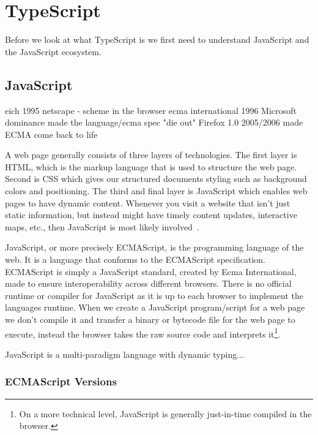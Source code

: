 
\section{TypeScript}\label{sec:typescript}

Before we look at what TypeScript is we first need to understand JavaScript and the JavaScript ecosystem.

\subsection{JavaScript}\label{subsec:javascript}


eich 1995 netscape - scheme in the browser
ecma international 1996
Microsoft dominance made the language/ecma spec "die out"
Firefox 1.0 2005/2006 made ECMA come back to life

A web page generally consists of three layers of technologies.
The first layer is HTML, which is the markup language that is used to structure the web page.
Second is CSS which gives our structured documents styling such as background colors and positioning.
The third and final layer is JavaScript which enables web pages to have dynamic content.
Whenever you visit a website that isn't just static information, but instead might have timely content updates, interactive maps, etc., then JavaScript is most likely involved~\cite{whatisjs}.

JavaScript, or more precisely ECMAScript, is the programming language of the web.
It is a language that conforms to the ECMAScript specification.
ECMAScript is simply a JavaScript standard, created by Ecma International, made to ensure interoperability across different browsers.
There is no official runtime or compiler for JavaScript as it is up to each browser to implement the languages runtime.
When we create a JavaScript program/script for a web page we don't compile it and transfer a binary or bytecode file for the web page to execute, instead the browser takes the raw source code and interprets it\footnote{On a more technical level, JavaScript is generally just-in-time compiled in the browser.}.

JavaScript is a multi-paradigm language with dynamic typing...

\subsubsection{ECMAScript Versions}

